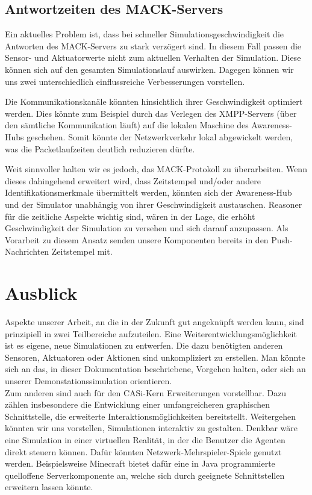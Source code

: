\subsection{Antwortzeiten des MACK-Servers}\label{subsec:conc_open_questions_mack}
Ein aktuelles Problem ist, dass bei schneller Simulationsgeschwindigkeit die Antworten des MACK-Servers zu stark verzögert sind. In diesem Fall passen die Sensor- und Aktuatorwerte nicht zum aktuellen Verhalten der Simulation. Diese können sich auf den gesamten Simulationslauf auswirken. Dagegen können wir uns zwei unterschiedlich einflussreiche Verbesserungen vorstellen. 

Die Kommunikationskanäle könnten hinsichtlich ihrer Geschwindigkeit optimiert werden. Dies könnte zum Beispiel durch das Verlegen des XMPP-Servers (über den sämtliche Kommunikation läuft) auf die lokalen Maschine des Awareness-Hubs geschehen. Somit könnte der Netzwerkverkehr lokal abgewickelt werden, was die Packetlaufzeiten deutlich reduzieren dürfte.

Weit sinnvoller halten wir es jedoch, das MACK-Protokoll zu überarbeiten. Wenn dieses dahingehend erweitert wird, dass Zeitstempel und/oder andere Identifikationsmerkmale übermittelt werden, könnten sich der Awareness-Hub und der Simulator unabhängig von ihrer Geschwindigkeit austauschen. Reasoner für die zeitliche Aspekte wichtig sind, wären in der Lage, die erhöht Geschwindigkeit der Simulation zu versehen und sich darauf anzupassen. Als Vorarbeit zu diesem Ansatz senden unsere Komponenten bereits in den Push-Nachrichten Zeitstempel mit.

\section{Ausblick}\label{sec:conc_outlook}
Aspekte unserer Arbeit, an die in der Zukunft gut angeknüpft werden kann, sind prinzipiell in zwei Teilbereiche aufzuteilen. Eine Weiterentwicklungsmöglichkeit ist es eigene, neue Simulationen zu entwerfen. Die dazu benötigten anderen Sensoren, Aktuatoren oder Aktionen sind unkompliziert zu erstellen. Man könnte sich an das, in dieser Dokumentation beschriebene, Vorgehen halten, oder sich an unserer Demonstations\-simulation orientieren.\\

Zum anderen sind auch für den CASi-Kern Erweiterungen vorstellbar. Dazu zählen insbesondere die Entwicklung einer umfangreicheren graphischen Schnittstelle, die erweiterte Interaktionsmöglichkeiten bereitstellt. Weitergehen könnten wir uns vorstellen, Simulationen interaktiv zu gestalten. Denkbar wäre  eine Simulation in einer virtuellen Realität, in der die Benutzer die Agenten direkt steuern können. Dafür könnten Netzwerk-Mehrspieler-Spiele genutzt werden. Beispielsweise Minecraft \cite{web-minecraft} bietet dafür eine in Java programmierte quelloffene Serverkomponente an, welche sich durch geeignete Schnittstellen erweitern lassen könnte.

